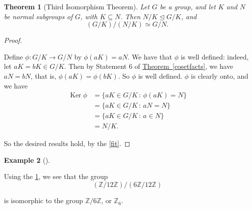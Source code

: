 \documentclass[10pt,]{book}
\theoremstyle{plain}
\newtheorem{theorem}{Theorem}[section]
\theoremstyle{definition}
\theoremstyle{definition}
\theoremstyle{definition}
\newtheorem{example}[theorem]{Example}
\theoremstyle{definition}
\numberwithin{equation}{section}
\def\Z{\mathbb{Z}}
\DeclareMathOperator{\Ker}{Ker}
\newcommand{\amp}{ & }
\begin{document}
\begin{theorem}[{Third Isomorphism Theorem}]\label{tit}
 Let \(G\) be a group,
        and let \(K\) and \(N\) be normal subgroups of \(G\), with \(K\subseteq N\).
        Then \(N/K \unlhd G/K\), and
\begin{equation*}

          (G/K)/(N/K)\simeq G/N.
        
\end{equation*}

\end{theorem}
\begin{proof}\hypertarget{proof-56}{}

      Define \(\phi: G/K\to G/N\) by \(\phi(aK)=aN\). We have that
      \(\phi\) is well defined: indeed, let \(aK=bK \in G/K\). Then by
      Statement 6 of \hyperref[cosetfacts]{Theorem~\ref{cosetfacts}}, we have \(aN=bN\), that
      is, \(\phi(aK)=\phi(bK)\). So \(\phi\) is well defined. \(\phi\) is
      clearly onto, and we have
\begin{align*}
\Ker \phi\amp =\{aK\in
        G/K\,:\,\phi(aK)=N\}\\
\amp =\{aK\in G/K\,:\,aN=N\}\\
\amp =\{aK\in
        G/K\,:\,a\in N\}\\
\amp =N/K.
\end{align*}

\par

      So the desired
      results hold, by the \hyperref[fit]{\ref{fit}}.
\end{proof}
\begin{example}[]\label{example-90}

        Using the \hyperref[tit]{\ref{tit}}, we see that the group
\begin{equation*}

          (\Z/12\Z)/(6\Z/12\Z)
        
\end{equation*}

        is isomorphic to the group \(\Z/6\Z\), or
        \(\Z_6\).
\end{example}
\typeout{************************************************}
\typeout{************************************************}
\end{document}
